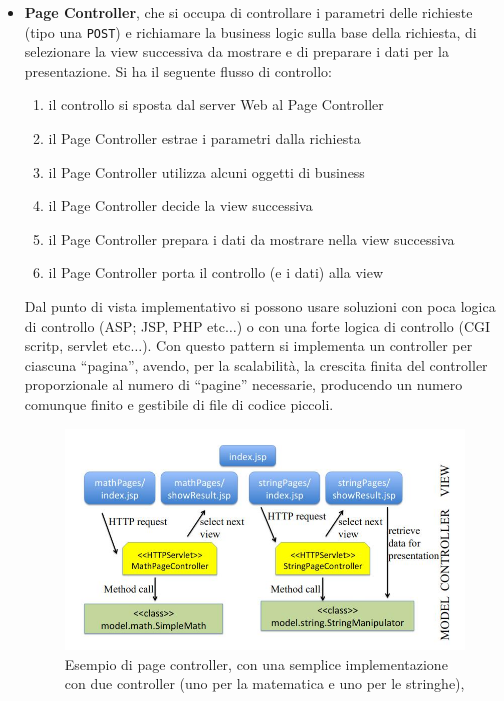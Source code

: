 \documentclass[a4paper,12pt, oneside]{book}
\begin{document}
\begin{itemize}
  \item \textbf{Page Controller}, che si occupa di controllare i parametri delle
  richieste (tipo una \texttt{POST}) e richiamare la business logic sulla base
  della richiesta, di selezionare la view successiva
  da mostrare e di preparare i dati per la presentazione. Si ha il seguente
  flusso di controllo:
  \begin{enumerate}
    \item il controllo si sposta dal server Web al Page Controller
    \item il Page Controller estrae i parametri dalla richiesta
    \item il Page Controller utilizza alcuni oggetti di business
    \item il Page Controller decide la view successiva
    \item il Page Controller prepara i dati da mostrare nella view successiva
    \item il Page Controller porta il controllo (e i dati) alla view
  \end{enumerate}
  Dal punto di vista implementativo si possono usare soluzioni con poca logica
  di controllo (ASP; JSP, PHP etc$\ldots$) o con una forte logica di controllo
  (CGI scritp, servlet etc$\ldots$). Con questo pattern si implementa un
  controller per ciascuna ``pagina'', avendo, per la scalabilità, la crescita
  finita del controller proporzionale al numero di ``pagine'' necessarie,
  producendo un numero comunque finito e gestibile di file di codice piccoli.
  \begin{figure}[H]
    \centering
    \includegraphics[scale = 0.4]{img/pc.jpg}
    \caption{Esempio di page controller, con una semplice implementazione con
      due controller (uno per la matematica e uno per le stringhe),
}
\end{figure}
\end{itemize}
\end{document}
